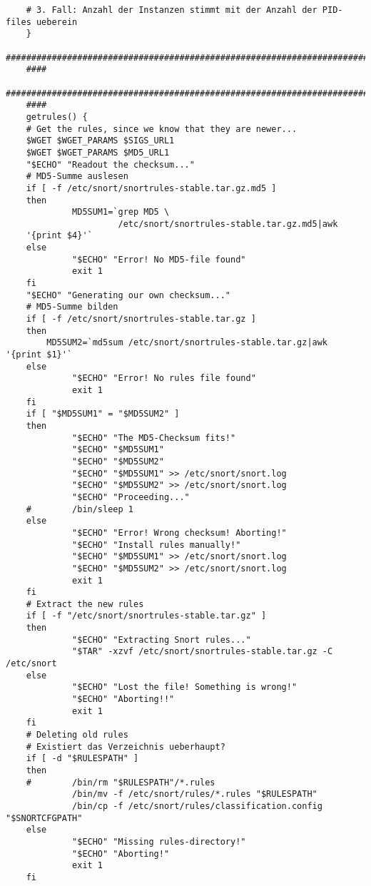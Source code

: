 \documentclass{article}
\begin{document}
\begin{verbatim}
    # 3. Fall: Anzahl der Instanzen stimmt mit der Anzahl der PID-files ueberein
    }
    ###########################################################################
    ####
    ###########################################################################
    ####
    getrules() {
    # Get the rules, since we know that they are newer...
    $WGET $WGET_PARAMS $SIGS_URL1
    $WGET $WGET_PARAMS $MD5_URL1
    "$ECHO" "Readout the checksum..."
    # MD5-Summe auslesen
    if [ -f /etc/snort/snortrules-stable.tar.gz.md5 ]
    then
             MD5SUM1=`grep MD5 \
                      /etc/snort/snortrules-stable.tar.gz.md5|awk 
    '{print $4}'`
    else
             "$ECHO" "Error! No MD5-file found"
             exit 1
    fi
    "$ECHO" "Generating our own checksum..."
    # MD5-Summe bilden
    if [ -f /etc/snort/snortrules-stable.tar.gz ]
    then
        MD5SUM2=`md5sum /etc/snort/snortrules-stable.tar.gz|awk '{print $1}'`
    else
             "$ECHO" "Error! No rules file found"
             exit 1
    fi
    if [ "$MD5SUM1" = "$MD5SUM2" ]
    then
             "$ECHO" "The MD5-Checksum fits!"
             "$ECHO" "$MD5SUM1"
             "$ECHO" "$MD5SUM2"
             "$ECHO" "$MD5SUM1" >> /etc/snort/snort.log
             "$ECHO" "$MD5SUM2" >> /etc/snort/snort.log
             "$ECHO" "Proceeding..."
    #        /bin/sleep 1
    else
             "$ECHO" "Error! Wrong checksum! Aborting!"
             "$ECHO" "Install rules manually!"
             "$ECHO" "$MD5SUM1" >> /etc/snort/snort.log
             "$ECHO" "$MD5SUM2" >> /etc/snort/snort.log
             exit 1
    fi
    # Extract the new rules
    if [ -f "/etc/snort/snortrules-stable.tar.gz" ]
    then
             "$ECHO" "Extracting Snort rules..."
             "$TAR" -xzvf /etc/snort/snortrules-stable.tar.gz -C /etc/snort
    else
             "$ECHO" "Lost the file! Something is wrong!"
             "$ECHO" "Aborting!!"
             exit 1
    fi
    # Deleting old rules
    # Existiert das Verzeichnis ueberhaupt?
    if [ -d "$RULESPATH" ]
    then
    #        /bin/rm "$RULESPATH"/*.rules
             /bin/mv -f /etc/snort/rules/*.rules "$RULESPATH"
             /bin/cp -f /etc/snort/rules/classification.config "$SNORTCFGPATH"
    else
             "$ECHO" "Missing rules-directory!"
             "$ECHO" "Aborting!"
             exit 1
    fi
     

\end{verbatim}
\end{document}
